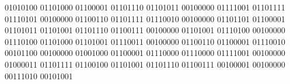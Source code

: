 01010100 01101000 01100001 01101110 01101011 00100000 01111001 01101111 01110101 00100000 01100110 01101111 01110010 00100000 01101101 01100001 01101011 01101001 01101110 01100111 00100000 01101001 01110100 00100000 01110100 01101000 01101001 01110011 00100000 01100110 01100001 01110010 00101100 00100000 01001000 01100001 01110000 01110000 01111001 00100000 01000011 01101111 01100100 01101001 01101110 01100111 00100001 00100000 00111010 00101001